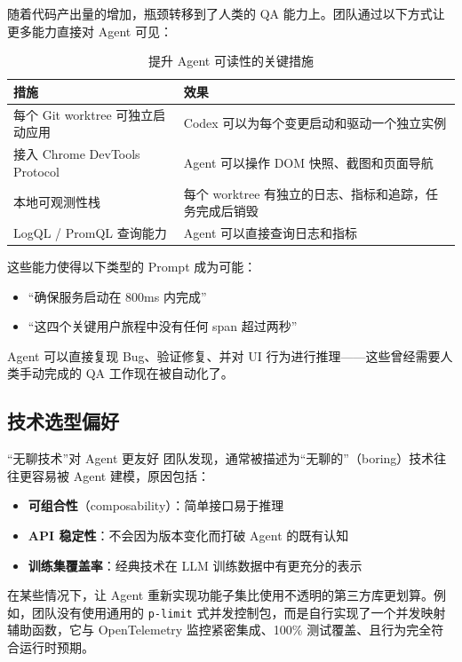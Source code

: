\documentclass[a4paper]{article}
\begin{document}
随着代码产出量的增加，瓶颈转移到了人类的 QA 能力上。团队通过以下方式让更多能力直接对 Agent 可见：

\begin{table}[H]
\centering
\small
\begin{tabular}{p{4cm}p{9cm}}
\toprule
\textbf{措施} & \textbf{效果} \\
\midrule
每个 Git worktree 可独立启动应用 & Codex 可以为每个变更启动和驱动一个独立实例 \\
接入 Chrome DevTools Protocol & Agent 可以操作 DOM 快照、截图和页面导航 \\
本地可观测性栈 & 每个 worktree 有独立的日志、指标和追踪，任务完成后销毁 \\
LogQL / PromQL 查询能力 & Agent 可以直接查询日志和指标 \\
\bottomrule
\end{tabular}
\caption{提升 Agent 可读性的关键措施}
\end{table}

这些能力使得以下类型的 Prompt 成为可能：
\begin{itemize}[nosep]
  \item ``确保服务启动在 800ms 内完成''
  \item ``这四个关键用户旅程中没有任何 span 超过两秒''
\end{itemize}

Agent 可以直接复现 Bug、验证修复、并对 UI 行为进行推理——这些曾经需要人类手动完成的 QA 工作现在被自动化了。

\subsection{技术选型偏好}

\begin{knowledgebox}{``无聊技术''对 Agent 更友好}
团队发现，通常被描述为``无聊的''（boring）技术往往更容易被 Agent 建模，原因包括：
\begin{itemize}[nosep]
  \item \textbf{可组合性}（composability）：简单接口易于推理
  \item \textbf{API 稳定性}：不会因为版本变化而打破 Agent 的既有认知
  \item \textbf{训练集覆盖率}：经典技术在 LLM 训练数据中有更充分的表示
\end{itemize}
在某些情况下，让 Agent 重新实现功能子集比使用不透明的第三方库更划算。例如，团队没有使用通用的 \texttt{p-limit} 式并发控制包，而是自行实现了一个并发映射辅助函数，它与 OpenTelemetry 监控紧密集成、100\% 测试覆盖、且行为完全符合运行时预期。
\end{knowledgebox}
\end{document}
